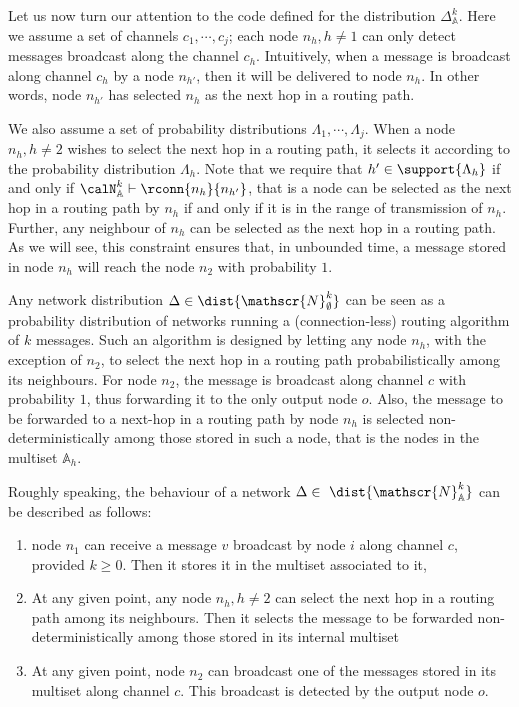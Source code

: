 \documentclass{LMCS}
\begin{document}
Let us now turn our attention to the code defined for 
the distribution 
$\Delta^k_{\mathbb{A}}$. Here we assume a set of 
channels $c_1,\cdots,c_j$;   
each node $n_h, h \neq 1$ can only detect messages 
broadcast along the channel $c_h$. Intuitively, when a 
message is broadcast along channel $c_h$ by a 
node $n_{h'}$, then it will be delivered to 
node $n_h$. In other words, node $n_{h'}$ has 
selected $n_h$ as the next hop in a routing path. 

We also assume a set of probability distributions 
$\Lambda_1,\cdots,\Lambda_j$. When a node $n_h, h \neq 2$ 
wishes to select the next hop in a routing path, 
it selects it according to the probability distribution 
$\Lambda_h$. Note that we require that $h' \in \support{\Lambda_h}$ 
if and only if $\calN^k_{\mathbb{A}} \vdash \rconn{n_h}{n_{h'}}$, 
that is a node can be selected as the next hop in a routing 
path by $n_h$ if and only if it is in the range of transmission 
of $n_h$. Further, any neighbour of $n_h$ can be selected 
as the next hop in a routing path. As we will see, this constraint 
ensures that, in unbounded time, a message stored in node $n_h$ 
will reach the node $n_2$ with probability $1$.

Any network distribution $\Delta \in \dist{\mathscr{N}^k_{\emptyset}}$ 
can be seen as a probability distribution of networks running a 
(connection-less) routing algorithm of $k$ messages. 
Such an algorithm is designed by letting any node $n_h$, with the exception of 
$n_2$, to select the next hop 
in a routing path probabilistically among its neighbours. 
For node $n_2$, the message is broadcast along channel $c$ 
with probability $1$, thus forwarding it to the only output node 
$o$.
Also, the message to be forwarded to a next-hop in a 
routing path by node $n_h$ is selected non-deterministically 
among those stored in such a node, that is the nodes in 
the multiset $\mathbb{A}_h$. 



Roughly speaking, the behaviour of a network $\Delta \in \
\dist{\mathscr{N}^k_{\mathbb{A}}}$ 
can be described as follows:
\begin{enumerate}
\item node $n_1$ can receive a message $v$ broadcast by node 
$i$ along channel $c$, provided $k \geq 0$. Then it stores it 
in the multiset associated to it,
\item At any given point, any node $n_h, h \neq 2$ 
can select the next hop in a routing path among its neighbours. 
Then it selects the message to be forwarded non-deterministically 
among those stored in its internal multiset
\item At any given point, node $n_2$ can broadcast one of 
the messages stored in its multiset along channel $c$. 
This broadcast is detected by the output node $o$.
\end{enumerate}
\end{document}
